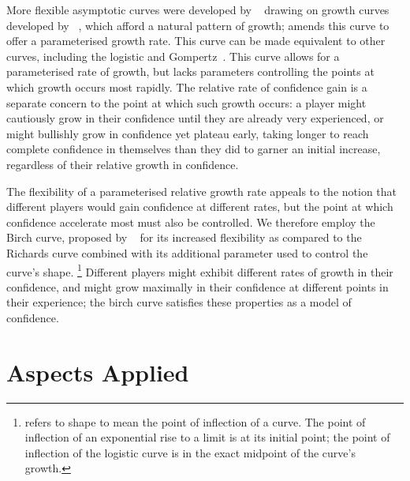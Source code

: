 More flexible asymptotic curves were developed by
\citeauthor{richards1959flexiblegrowth}~\cite{richards1959flexiblegrowth} drawing on growth curves developed by
\citeauthor{von1938quantitative}~\cite{von1938quantitative}, which afford a natural pattern of growth;
\citeauthor{richards1959flexiblegrowth} amends this curve to offer a parameterised growth rate. This curve
can be made equivalent to other curves, including the logistic and Gompertz~\cite{france1984mathematical}.
This curve allows for a parameterised rate of growth, but lacks parameters controlling the points at which
growth occurs most rapidly. The relative rate of confidence gain is a separate concern to the point at which
such growth occurs: a player might cautiously grow in their confidence until they are already very experienced, or
might bullishly grow in confidence yet plateau early, taking longer to reach complete confidence in themselves
than they did to garner an initial increase, regardless of their relative growth in confidence.

The flexibility of a parameterised relative growth rate appeals to the notion that different players would
gain confidence at different rates, but the point at which confidence accelerate most must also be controlled.
We therefore employ the Birch curve, proposed by \citeauthor{birch1999new}~\cite{birch1999new} for
its increased flexibility as compared to the Richards curve combined with its additional parameter used to control
the curve's shape.
\footnote{\citeauthor{birch1999new} refers to shape to mean the point of inflection of a curve. The point
of inflection of an exponential rise to a limit is at its initial point; the point of inflection of the
logistic curve is in the exact midpoint of the curve's growth.}
Different players might exhibit different rates of growth in their confidence, and might grow maximally in their
confidence at different points in their experience; the birch curve satisfies these properties as a model of
confidence.


\section{Aspects Applied}\label{sec:optimisation_with_aspects_aspectsdeveloped}




